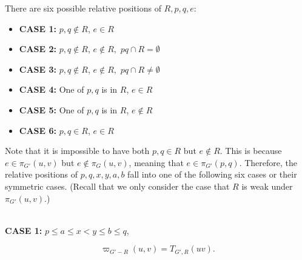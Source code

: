 \documentclass[11pt]{article}
\theoremstyle{plain}
\theoremstyle{definition}
\newcommand{\new}[1]{\pi_{G'}(#1)}
\newcommand{\ndg}[3]{\varpi_{G'-#3}\left(#1,#2\right)}
\newcommand{\pp}[1]{T_{G',R}\left(#1\right)}
\begin{document}
There are six possible relative positions of $R,p,q,e$:
\begin{itemize}
    \item \textbf{CASE 1:} $p,q\not\in R$, $e\in R$
    \item \textbf{CASE 2:} $p,q\not\in R$, $e\not\in R,$ $pq\cap R=\emptyset$
    \item \textbf{CASE 3:} $p,q\not\in R$, $e\not\in R,$ $pq\cap R\ne\emptyset$
    \item \textbf{CASE 4:} One of $p,q$ is in $R$, $e\in R$
    \item \textbf{CASE 5:} One of $p,q$ is in $R$, $e\not\in R$
    \item \textbf{CASE 6:} $p,q\in R$, $e\in R$
\end{itemize}

Note that it is impossible to have both $p,q\in R$ but $e\not\in R.$ This is because $e\in\new{u,v}$ but $e\not\in \pi_G(u,v)$, meaning that $e\in \new{p,q}.$ Therefore, the relative positions of $p,q,x,y,a,b$ fall into one of the following six cases or their symmetric cases. (Recall that we only consider the case that $R$ is weak under $\new{u,v}$.)






~\\
\noindent\textbf{CASE 1:} $p\le a\le x<y\le b\le q$,

$$\ndg{u}{v}{R}=\pp{uv}.$$
\end{document}
